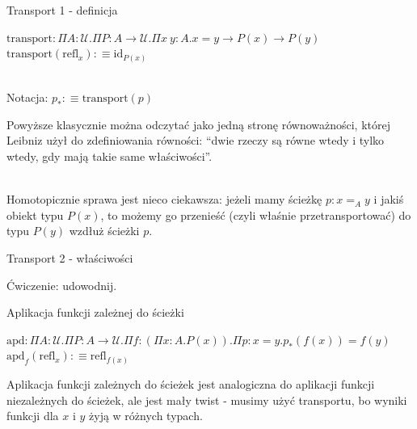\documentclass{beamer}
\newcommand{\defn}{:\equiv}
\newcommand{\U}{\mathcal{U}}
\newcommand{\refl}[1]{\text{refl}_{#1}}
\newcommand{\apd}[2]{\text{apd}_{#1}(#2)}
\begin{document}
\begin{frame}{Transport 1 - definicja}

\begin{definition}

$\text{transport} : \Pi A : \U. \Pi P : A \to \U. \Pi x\ y : A. x = y \to P(x) \to P(y)$ \\
$\text{transport}(\refl{x}) \defn \text{id}_{P(x)}$ \\~\

Notacja: $p_* \defn \text{transport}(p)$

\end{definition}

Powyższe klasycznie można odczytać jako jedną stronę równoważności, której Leibniz użył do zdefiniowania równości: ``dwie rzeczy są równe wtedy i tylko wtedy, gdy mają takie same właściwości''.\\~\

Homotopicznie sprawa jest nieco ciekawsza: jeżeli mamy ścieżkę $p : x =_A y$ i jakiś obiekt typu $P(x)$, to możemy go przenieść (czyli właśnie przetransportować) do typu $P(y)$ wzdłuż ścieżki $p$.

\end{frame}

\begin{frame}{Transport 2 - właściwości}


Ćwiczenie: udowodnij.

\end{frame}

\begin{frame}{Aplikacja funkcji zależnej do ścieżki}

\begin{definition}[Lemat 2.3.4]

$\text{apd} : \Pi A : \U. \Pi P : A \to \U. \Pi f : (\Pi x : A. P(x)). \Pi p : x = y. p_*(f(x)) = f(y)$ \\
$\apd{f}{\refl{x}} \defn \refl{f(x)}$

\end{definition}

Aplikacja funkcji zależnych do ścieżek jest analogiczna do aplikacji funkcji niezależnych do ścieżek, ale jest mały twist - musimy użyć transportu, bo wyniki funkcji dla $x$ i $y$ żyją w różnych typach.

\end{frame}
\end{document}
